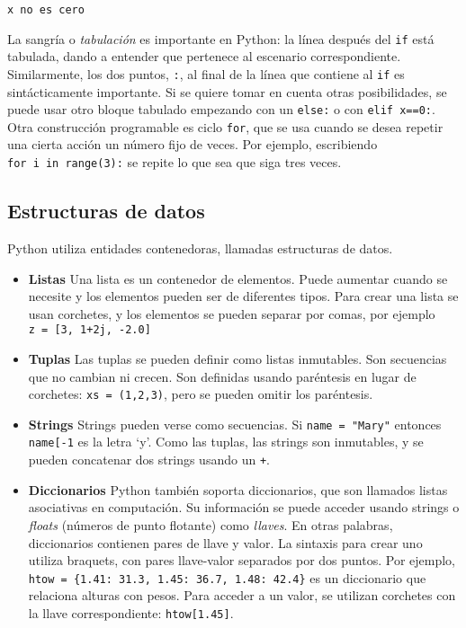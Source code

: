 \documentclass[11pt]{article}
\providecommand{\tightlist}{%
      \setlength{\itemsep}{0pt}\setlength{\parskip}{0pt}}
\begin{document}
    \begin{Verbatim}[commandchars=\\\{\}]
x no es cero
\end{Verbatim}

    La sangría o \emph{tabulación} es importante en Python: la línea después
del \texttt{if} está tabulada, dando a entender que pertenece al
escenario correspondiente. Similarmente, los dos puntos, \texttt{:}, al
final de la línea que contiene al \texttt{if} es sintácticamente
importante. Si se quiere tomar en cuenta otras posibilidades, se puede
usar otro bloque tabulado empezando con un \texttt{else:} o con
\texttt{elif\ x==0:}.\\
Otra construcción programable es ciclo \texttt{for}, que se usa cuando
se desea repetir una cierta acción un número fijo de veces. Por ejemplo,
escribiendo \texttt{for\ i\ in\ range(3):} se repite lo que sea que siga
tres veces.

\hypertarget{estructuras-de-datos}{%
\subsection{Estructuras de datos}\label{estructuras-de-datos}}

Python utiliza entidades contenedoras, llamadas estructuras de datos.

\begin{itemize}
\tightlist
\item
  \textbf{Listas} Una lista es un contenedor de elementos. Puede
  aumentar cuando se necesite y los elementos pueden ser de diferentes
  tipos. Para crear una lista se usan corchetes, y los elementos se
  pueden separar por comas, por ejemplo
  \texttt{z\ =\ {[}3,\ 1+2j,\ -2.0{]}}
\item
  \textbf{Tuplas} Las tuplas se pueden definir como listas inmutables.
  Son secuencias que no cambian ni crecen. Son definidas usando
  paréntesis en lugar de corchetes: \texttt{xs\ =\ (1,2,3)}, pero se
  pueden omitir los paréntesis.
\item
  \textbf{Strings} Strings pueden verse como secuencias. Si
  \texttt{name\ =\ "Mary"} entonces \texttt{name{[}-1} es la letra `y'.
  Como las tuplas, las strings son inmutables, y se pueden concatenar
  dos strings usando un \texttt{+}.
\item
  \textbf{Diccionarios} Python también soporta diccionarios, que son
  llamados listas asociativas en computación. Su información se puede
  acceder usando strings o \emph{floats} (números de punto flotante)
  como \emph{llaves}. En otras palabras, diccionarios contienen pares de
  llave y valor. La sintaxis para crear uno utiliza braquets, con pares
  llave-valor separados por dos puntos. Por ejemplo,
  \texttt{htow\ =\ \{1.41:\ 31.3,\ 1.45:\ 36.7,\ 1.48:\ 42.4\}} es un
  diccionario que relaciona alturas con pesos. Para acceder a un valor,
  se utilizan corchetes con la llave correspondiente:
  \texttt{htow{[}1.45{]}}.
\end{itemize}
\end{document}
